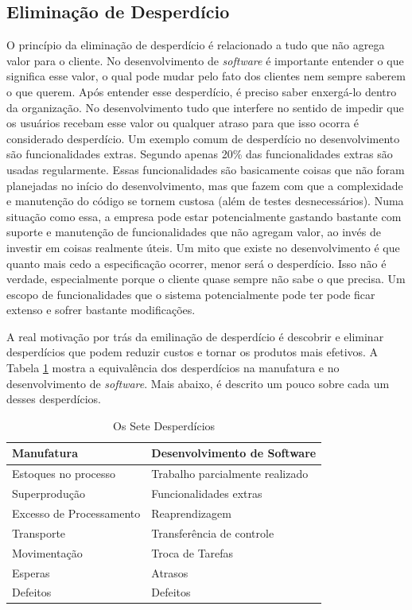\subsection{Eliminação de Desperdício}
\label{sec:desperdicios}
O princípio da eliminação de desperdício é relacionado a tudo que não agrega valor para o cliente. No desenvolvimento de \textit{software} é importante entender o que significa esse valor, o qual pode mudar pelo fato dos clientes nem sempre saberem o que querem. Após entender esse desperdício, é preciso saber enxergá-lo dentro da organização. No desenvolvimento tudo que interfere no sentido de impedir que os usuários recebam esse valor ou qualquer atraso para que isso ocorra é considerado desperdício. Um exemplo comum de desperdício no desenvolvimento são funcionalidades extras. Segundo  apenas 20\% das funcionalidades extras são usadas regularmente. Essas funcionalidades são basicamente coisas que não foram planejadas no início do desenvolvimento, mas que fazem com que a complexidade e manutenção do código se tornem custosa (além de testes desnecessários). Numa situação como essa, a empresa pode estar potencialmente gastando bastante com suporte e manutenção de funcionalidades que não agregam valor, ao invés de investir em coisas realmente úteis. Um mito que existe no desenvolvimento é que quanto mais cedo a especificação ocorrer, menor será o desperdício. Isso não é verdade, especialmente porque o cliente quase sempre não sabe o que precisa. Um escopo de funcionalidades que o sistema potencialmente pode ter pode ficar extenso e sofrer bastante modificações. 

A real motivação por trás da emilinação de desperdício é descobrir e eliminar desperdícios que podem reduzir custos e tornar os produtos mais efetivos. A Tabela \ref{tab:desperdicio} mostra a equivalência dos desperdícios na manufatura e no desenvolvimento de \textit{software}. Mais abaixo, é descrito um pouco sobre cada um desses desperdícios.

\begin{table}[htb!]
\centering
\caption{Os Sete Desperdícios}
\label{tab:desperdicio}
\vspace{0.5cm}
\begin{tabular}{l|l}

\hline                                
\textbf{Manufatura} & \textbf{Desenvolvimento de Software} \\ 
\hline                               
Estoques no processo & Trabalho parcialmente realizado \\
Superprodução & Funcionalidades extras \\
Excesso de Processamento & Reaprendizagem \\
Transporte & Transferência de controle \\
Movimentação & Troca de Tarefas \\
Esperas & Atrasos\\
Defeitos & Defeitos \\                               
\end{tabular}
\end{table}

